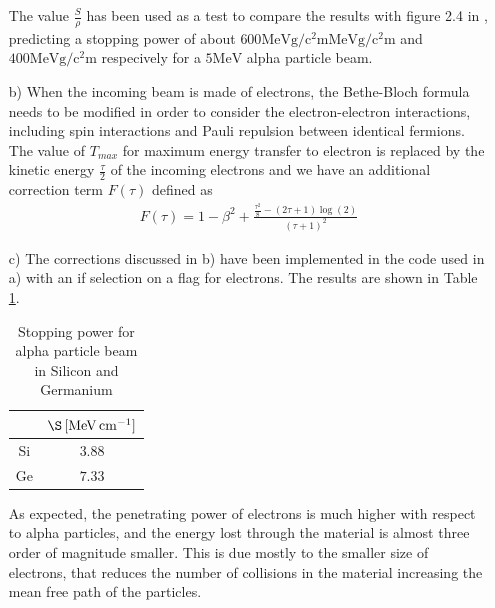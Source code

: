 \documentclass[10pt,a4paper]{article}
\begin{document}
\begin{enumerate}
The value $\frac{S}{\rho}$ has been used as a test to compare the results with figure 2.4 in \cite{Tavernier}, predicting a stopping power of about $600\si{\mega\electronvolt\gram\per\square\centi\meter}\si{\mega\electronvolt\gram\per\square\centi\meter}$ and $400\si{\mega\electronvolt\gram\per\square\centi\meter}$ respecively for a $5\si{\mega\electronvolt}$ alpha particle beam.

\item[b)] When the incoming beam is made of electrons, the Bethe-Bloch formula needs to be modified in order to consider the electron-electron interactions, including spin interactions and Pauli repulsion between identical fermions. 
The value of $T_{max}$ for maximum energy transfer to electron is replaced by the kinetic energy $\frac{\tau}{2}$ of the incoming electrons and we have an additional correction term $F(\tau)$ defined as
\begin{align*}
F(\tau) = 1-\beta^2 + \frac{ \frac{\tau^2}{8} - (2\tau+1)\log(2) }{(\tau+1)^2}
\end{align*}

\item[c)] The corrections discussed in b) have been implemented in the code used in a) with an if selection on a flag for electrons. The results are shown in Table \ref{tab:electronbeam}.
\begin{table}[!ht]
\centering
\begin{tabular}{cc}
\toprule
  & $\S\,[\si{\mega\electronvolt\per\centi\meter}]$ \\
  \midrule
  Si & $3.88$ \\
  Ge & $7.33$ \\
  \bottomrule
\end{tabular}
\caption{Stopping power for alpha particle beam in Silicon and Germanium}
\label{tab:electronbeam}
\end{table}
As expected, the penetrating power of electrons is much higher with respect to alpha particles, and the energy lost through the material is almost three order of magnitude smaller. This is due mostly to the smaller size of electrons, that reduces the number of collisions in the material increasing the mean free path of the particles. 
\end{enumerate}

\end{document}
